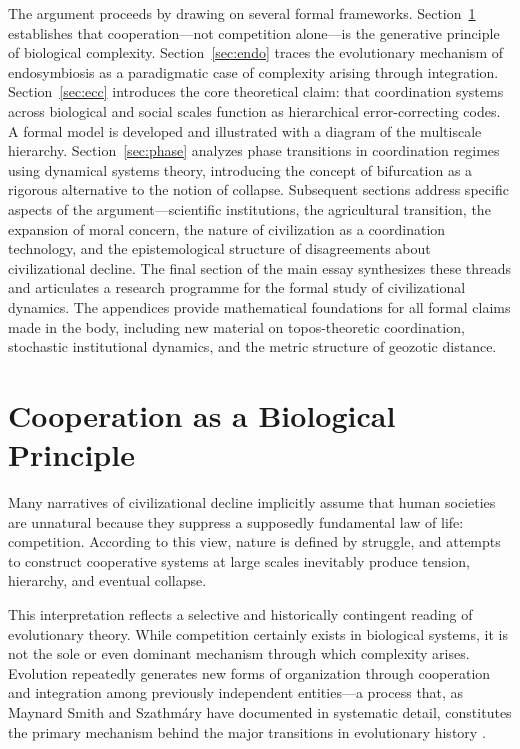 \documentclass[12pt]{article}
\begin{document}
The argument proceeds by drawing on several formal frameworks. Section~\ref{sec:bio} establishes that cooperation---not competition alone---is the generative principle of biological complexity. Section~\ref{sec:endo} traces the evolutionary mechanism of endosymbiosis as a paradigmatic case of complexity arising through integration. Section~\ref{sec:ecc} introduces the core theoretical claim: that coordination systems across biological and social scales function as hierarchical error-correcting codes. A formal model is developed and illustrated with a diagram of the multiscale hierarchy. Section~\ref{sec:phase} analyzes phase transitions in coordination regimes using dynamical systems theory, introducing the concept of bifurcation as a rigorous alternative to the notion of collapse. Subsequent sections address specific aspects of the argument---scientific institutions, the agricultural transition, the expansion of moral concern, the nature of civilization as a coordination technology, and the epistemological structure of disagreements about civilizational decline. The final section of the main essay synthesizes these threads and articulates a research programme for the formal study of civilizational dynamics. The appendices provide mathematical foundations for all formal claims made in the body, including new material on topos-theoretic coordination, stochastic institutional dynamics, and the metric structure of geozotic distance.

\section{Cooperation as a Biological Principle}
\label{sec:bio}

Many narratives of civilizational decline implicitly assume that human societies are unnatural because they suppress a supposedly fundamental law of life: competition. According to this view, nature is defined by struggle, and attempts to construct cooperative systems at large scales inevitably produce tension, hierarchy, and eventual collapse.

This interpretation reflects a selective and historically contingent reading of evolutionary theory. While competition certainly exists in biological systems, it is not the sole or even dominant mechanism through which complexity arises. Evolution repeatedly generates new forms of organization through cooperation and integration among previously independent entities---a process that, as Maynard Smith and Szathmáry have documented in systematic detail, constitutes the primary mechanism behind the major transitions in evolutionary history \cite{smithszathmary1995}.
\end{document}
